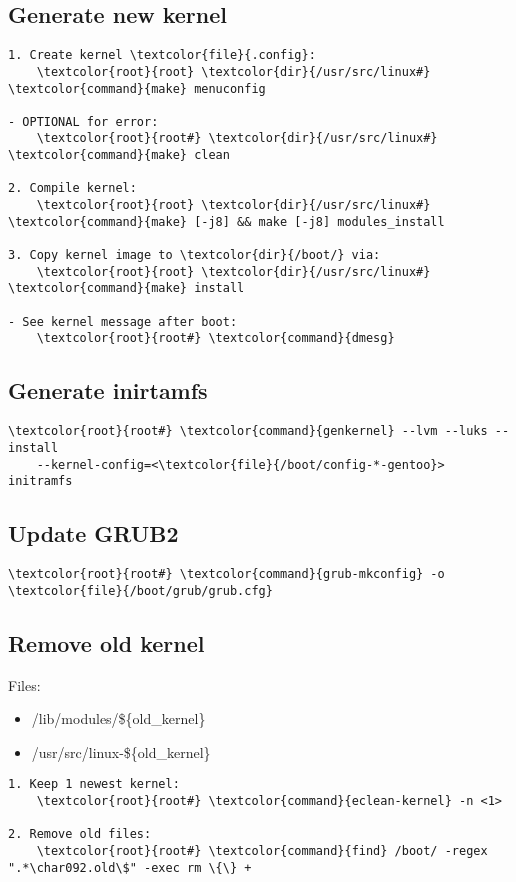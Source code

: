 \documentclass[10pt, a4paper, onecolumn, openany]{book}         %
\begin{document}
\subsection{Generate new kernel}
\begin{Verbatim}[commandchars=\\\{\}]
1. Create kernel \textcolor{file}{.config}:
    \textcolor{root}{root} \textcolor{dir}{/usr/src/linux#}  \textcolor{command}{make} menuconfig

- OPTIONAL for error:
    \textcolor{root}{root#} \textcolor{dir}{/usr/src/linux#} \textcolor{command}{make} clean

2. Compile kernel:
    \textcolor{root}{root} \textcolor{dir}{/usr/src/linux#} \textcolor{command}{make} [-j8] && make [-j8] modules_install
    
3. Copy kernel image to \textcolor{dir}{/boot/} via:
    \textcolor{root}{root} \textcolor{dir}{/usr/src/linux#} \textcolor{command}{make} install
    
- See kernel message after boot:
    \textcolor{root}{root#} \textcolor{command}{dmesg}
\end{Verbatim}
\subsection{Generate inirtamfs}
\begin{Verbatim}[commandchars=\\\{\}]
    \textcolor{root}{root#} \textcolor{command}{genkernel} --lvm --luks --install
    --kernel-config=<\textcolor{file}{/boot/config-*-gentoo}> initramfs
\end{Verbatim}

\subsection{Update GRUB2}
\label{update-grub}
\begin{Verbatim}[commandchars=\\\{\}]
    \textcolor{root}{root#} \textcolor{command}{grub-mkconfig} -o \textcolor{file}{/boot/grub/grub.cfg}
\end{Verbatim}

\subsection{Remove old kernel}
Files:\newline
\begin{itemize}
    \item \textcolor{file}{/lib/modules/\$\{old\_kernel\}}
    \item \textcolor{file}{/usr/src/linux-\$\{old\_kernel\}}
\end{itemize}
\begin{Verbatim}[commandchars=\\\{\}]
1. Keep 1 newest kernel:
    \textcolor{root}{root#} \textcolor{command}{eclean-kernel} -n <1>
    
2. Remove old files:
    \textcolor{root}{root#} \textcolor{command}{find} /boot/ -regex ".*\char092.old\$" -exec rm \{\} +
\end{Verbatim}
\end{document}
